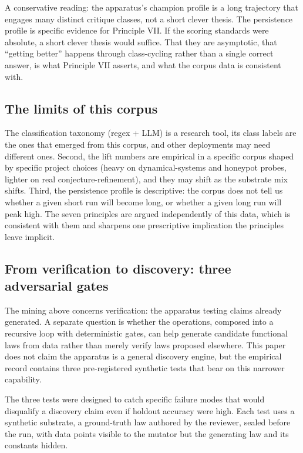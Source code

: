 \documentclass[
  11pt,
]{article}
\begin{document}
A conservative reading: the apparatus's champion profile is a
long trajectory that engages many distinct
critique classes, not a short clever thesis. The persistence profile is
specific evidence for Principle VII. If the scoring standards were
absolute, a short clever thesis would suffice. That they are asymptotic,
that ``getting better'' happens through class-cycling rather than a single
correct answer, is what Principle VII asserts, and what the corpus data is
consistent with.

\subsection{The limits of this
corpus}\label{the-limits-of-this-corpus}

The classification taxonomy (regex
+ LLM) is a research tool, its class labels are the ones that
emerged from this corpus, and other deployments may need
different ones. Second, the lift numbers are empirical in a specific
corpus shaped by specific project choices (heavy on dynamical-systems and
honeypot probes, lighter on real conjecture-refinement), and they may
shift as the substrate mix shifts. Third, the
persistence profile is descriptive: the corpus does not tell us whether a
given short run will become long, or whether a given long run will peak
high. The seven principles are argued independently of this data, which is
consistent with them and sharpens one prescriptive implication the
principles leave implicit.

\subsection{From verification to discovery: three adversarial
gates}\label{from-verification-to-discovery-three-adversarial-gates}

The mining above concerns verification: the apparatus testing claims already
generated. A separate question is whether the operations, composed into a
recursive loop with deterministic gates, can help generate candidate
functional laws from data rather than merely verify laws proposed
elsewhere. This paper does not claim the apparatus
is a general discovery engine, but the empirical record contains three
pre-registered synthetic tests that bear on this narrower capability.

The three tests were designed to catch specific failure modes that would
disqualify a discovery claim even if holdout accuracy were high. Each test
uses a synthetic substrate, a ground-truth law authored by the reviewer,
sealed before the run, with data points visible to the mutator but the
generating law and its constants hidden.
\end{document}
